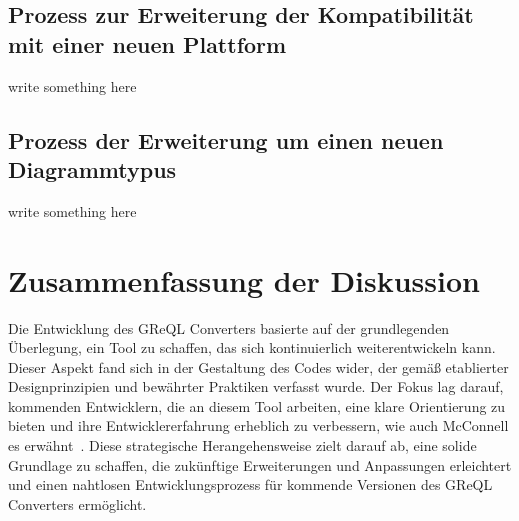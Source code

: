 \subsection{Prozess zur Erweiterung der Kompatibilität mit einer neuen Plattform}
write something here

\subsection{Prozess der Erweiterung um einen neuen Diagrammtypus}
write something here


\section{Zusammenfassung der Diskussion}

Die Entwicklung des GReQL Converters basierte auf der grundlegenden Überlegung, ein Tool zu schaffen, das sich
kontinuierlich weiterentwickeln kann. Dieser Aspekt fand sich in der Gestaltung des Codes wider, der gemäß etablierter
Designprinzipien und bewährter Praktiken verfasst wurde. Der Fokus lag darauf, kommenden Entwicklern, die an diesem Tool
arbeiten, eine klare Orientierung zu bieten und ihre Entwicklererfahrung erheblich zu verbessern, wie auch McConnell es
erwähnt~\cite{mcconnell2006software}. Diese strategische Herangehensweise zielt darauf ab, eine solide Grundlage zu
schaffen, die zukünftige Erweiterungen und Anpassungen erleichtert und einen nahtlosen Entwicklungsprozess für kommende
Versionen des GReQL Converters ermöglicht.
